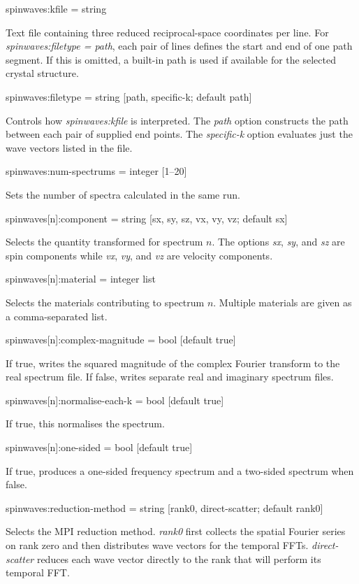 {\zicf spinwaves:kfile = string}
Text file containing three reduced reciprocal-space coordinates per line. 
For \textit{spinwaves:filetype = path}, each pair of lines defines the start and end of one path segment.
If this is omitted, a built-in path is used if available for the selected crystal structure.

{\zicf spinwaves:filetype = string [path, specific-k; default path]}
Controls how \textit{spinwaves:kfile} is interpreted. The \textit{path} option constructs the path between each pair of supplied end points. 
The \textit{specific-k} option evaluates just the wave vectors listed in the file.

{\zicf spinwaves:num-spectrums = integer [1--20]}
Sets the number of spectra calculated in the same run.

{\zicf spinwaves[n]:component = string [sx, sy, sz, vx, vy, vz; default sx]}
Selects the quantity transformed for spectrum $n$. The options \textit{sx}, \textit{sy}, and \textit{sz} are spin components while \textit{vx}, \textit{vy}, and \textit{vz} are velocity components.

{\zicf spinwaves[n]:material = integer list}
Selects the materials contributing to spectrum $n$. Multiple materials are given as a comma-separated list.

{\zicf spinwaves[n]:complex-magnitude = bool [default true]}
If true, writes the squared magnitude of the complex Fourier transform to the real spectrum file. 
If false, writes separate real and imaginary spectrum files.

{\zicf spinwaves[n]:normalise-each-k = bool [default true]}
If true, this normalises the spectrum.

{\zicf spinwaves[n]:one-sided = bool [default true]}
If true, produces a one-sided frequency spectrum and a two-sided spectrum when false.

{\zicf spinwaves:reduction-method = string [rank0, direct-scatter; default rank0]}
Selects the MPI reduction method. \textit{rank0} first collects the spatial Fourier series on rank zero and then distributes wave vectors for the temporal FFTs. 
\textit{direct-scatter} reduces each wave vector directly to the rank that will perform its temporal FFT. 


